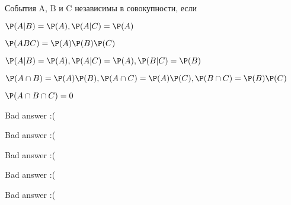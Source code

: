 
\begin{question}
События A, B и C независимы в совокупности, если
\begin{answerlist}
  \item \(\P(A|B) = \P(A), \P(A|C) = \P(A)\)
  \item \(\P(ABC) = \P(A) \P(B) \P(C)\)
  \item \(\P(A|B) = \P(A), \P(A|C) = \P(A), \P(B|C) = \P(B)\)
  \item \(\P(A\cap B) = \P(A)\P(B), \P(A\cap C) = \P(A)\P(C), \P(B\cap C) = \P(B)\P(C)\)
  \item \(\P(A \cap B \cap C) = 0\)
\end{answerlist}
\end{question}

\begin{solution}
\begin{answerlist}
  \item Bad answer :(
  \item Bad answer :(
  \item Bad answer :(
  \item Bad answer :(
  \item Bad answer :(
\end{answerlist}
\end{solution}

